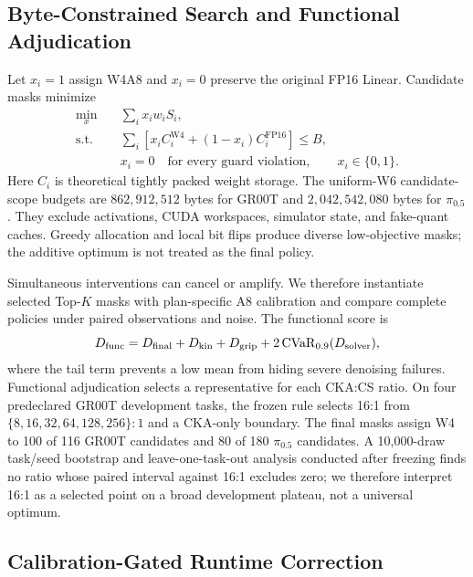 \subsection{Byte-Constrained Search and Functional Adjudication}
\label{sec:selection}

Let $x_i=1$ assign W4A8 and $x_i=0$ preserve the original FP16 Linear. Candidate masks minimize
\begin{align}
\min_x\quad &\sum_i x_i w_i S_i, \label{eq:objective}\\
\text{s.t.}\quad
&\sum_i\left[x_i C_i^{\mathrm{W4}}+(1-x_i)C_i^{\mathrm{FP16}}\right]\le B,\nonumber\\
&x_i=0\quad\text{for every guard violation},\qquad x_i\in\{0,1\}.\nonumber
\end{align}
Here $C_i$ is theoretical tightly packed weight storage. The uniform-W6 candidate-scope budgets are $862{,}912{,}512$ bytes for GR00T and $2{,}042{,}542{,}080$ bytes for $\pi_{0.5}$. They exclude activations, CUDA workspaces, simulator state, and fake-quant caches. Greedy allocation and local bit flips produce diverse low-objective masks; the additive optimum is not treated as the final policy.

Simultaneous interventions can cancel or amplify. We therefore instantiate selected Top-$K$ masks with plan-specific A8 calibration and compare complete policies under paired observations and noise. The functional score is
\begin{equation}
D_{\mathrm{func}}=D_{\mathrm{final}}+D_{\mathrm{kin}}+D_{\mathrm{grip}}
       +2\operatorname{CVaR}_{0.9}(D_{\mathrm{solver}}),
\label{eq:dfunc}
\end{equation}
where the tail term prevents a low mean from hiding severe denoising failures. Functional adjudication selects a representative for each CKA:CS ratio. On four predeclared GR00T development tasks, the frozen rule selects 16:1 from $\{8,16,32,64,128,256\}:1$ and a CKA-only boundary. The final masks assign W4 to 100 of 116 GR00T candidates and 80 of 180 $\pi_{0.5}$ candidates. A 10,000-draw task/seed bootstrap and leave-one-task-out analysis conducted after freezing finds no ratio whose paired interval against 16:1 excludes zero; we therefore interpret 16:1 as a selected point on a broad development plateau, not a universal optimum.

\subsection{Calibration-Gated Runtime Correction}
\label{sec:runtime_selector}

